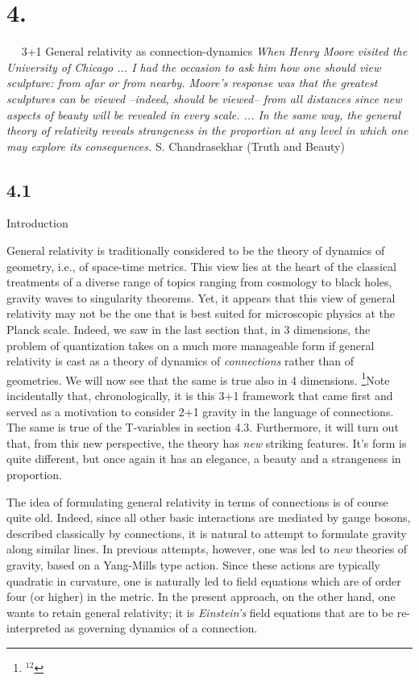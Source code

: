 \goodbreak
\vfill\break

%
\def\E{$\tw E^a{}_i$}  \def\e{$e^a{}_I$}
\def\A{$A_a{}^i$}      \def \fA{${}^4\!A_a{}^{IJ}$}
%
\section{4.}{${}\quad$ 3+1 General relativity as connection-dynamics}
\medskip
{\narrower\narrower\smallskip\noindent
{\sl When Henry Moore visited the University of Chicago ... I had
the occasion to ask him how one should view sculpture: from
afar or from nearby. Moore's response was that the greatest
sculptures can be viewed --indeed, should be viewed-- from all
distances since new aspects of beauty will be revealed in every
scale. ... In the same way, the general theory of relativity
reveals strangeness in the proportion at any level in which
one may explore its consequences.}
\smallskip
S. Chandrasekhar (Truth and Beauty)\smallskip}

\subsection{4.1}{Introduction}

General relativity is traditionally considered to be the theory of  dynamics
of geometry, i.e., of space-time metrics. This view lies at the heart of the
classical treatments of a diverse range of topics ranging from cosmology to
black holes, gravity waves to singularity theorems. Yet, it appears that this
view of general relativity may not be the one that is best suited for
microscopic physics at the Planck scale. Indeed, we saw in the last section
that, in 3 dimensions, the problem of quantization takes on a much more
manageable form if general relativity is cast as a theory of dynamics of
{\it connections} rather than of geometries. We will now see that the same
is true also in 4 dimensions.%
\footnote{$^{12}$}{Note incidentally that, chronologically, it is this 3+1 framework
that came first and served as a motivation to consider 2+1 gravity in the
language of connections. The same is true of the T-variables in section 4.3.}
Furthermore, it will turn out that, from this new perspective, the theory
has {\it new} striking features. It's form is quite different, but once again
it has an elegance, a beauty and a strangeness in proportion.

The idea of formulating general relativity in terms of connections is
of course quite old. Indeed, since all other basic interactions are
mediated by gauge bosons, described classically by connections, it is
natural to attempt to formulate gravity along similar lines.
In previous attempts, however, one was led to {\it new} theories of
gravity, based on a Yang-Mills type action. Since these actions are
typically quadratic in curvature, one is naturally led to field equations
which are of order four (or higher) in the metric. In the present approach,
on the other hand, one wants to retain general relativity; it is {\it
Einstein's} field equations that are to be re-interpreted as governing
dynamics of a connection.

